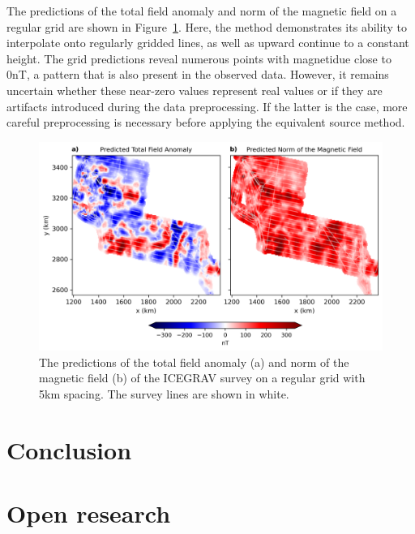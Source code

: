 The predictions of the total field anomaly and norm of the magnetic field on a regular grid are shown in Figure~\ref{fig:real_grid_pred}. Here, the method demonstrates its ability to interpolate onto regularly gridded lines, as well as upward continue to a constant height. The grid predictions reveal numerous points with magnetidue close to 0nT, a pattern that is also present in the observed data. However, it remains uncertain whether these near-zero values represent real values or if they are artifacts introduced during the data preprocessing. If the latter is the case, more careful preprocessing is necessary before applying the equivalent source method.

\begin{figure}[!h]
\centering
\includegraphics[width=1\linewidth]{paper/figures/real_grid_pred.png}
\caption{
    The predictions of the total field anomaly (a) and norm of the magnetic field (b) of the ICEGRAV survey \citep{ICEGRAV_data} on a regular grid with 5km spacing. The survey lines are shown in white.
}
\label{fig:real_grid_pred}
\end{figure}
\clearpage

\section{Conclusion}

\lipsum[1]


\section{Open research}

